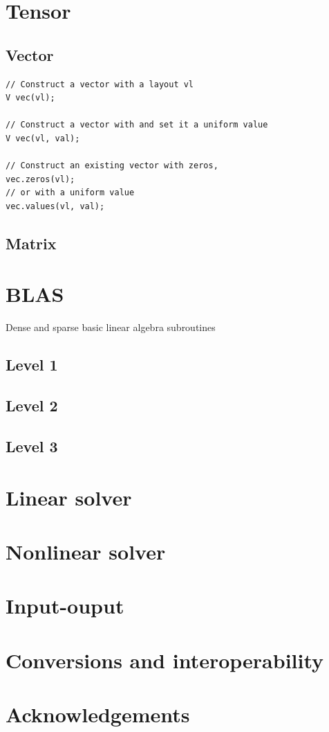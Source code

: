 \documentclass[a4paper,landscape,columns=3]{cheatsheet} %
\begin{document}
\section{Tensor}
\subsection{Vector}
\begin{lstlisting}
// Construct a vector with a layout vl
V vec(vl);

// Construct a vector with and set it a uniform value
V vec(vl, val);

// Construct an existing vector with zeros,
vec.zeros(vl);
// or with a uniform value
vec.values(vl, val);

\end{lstlisting}
\subsection{Matrix}

\section{BLAS}
Dense and sparse basic linear algebra subroutines
\subsection{Level 1}

\subsection{Level 2}

\subsection{Level 3}


\section{Linear solver}


\section{Nonlinear solver}

\section{Input-ouput}


\section{Conversions and interoperability}


\section{Acknowledgements}
\cite{utopiagit}



\end{document}
